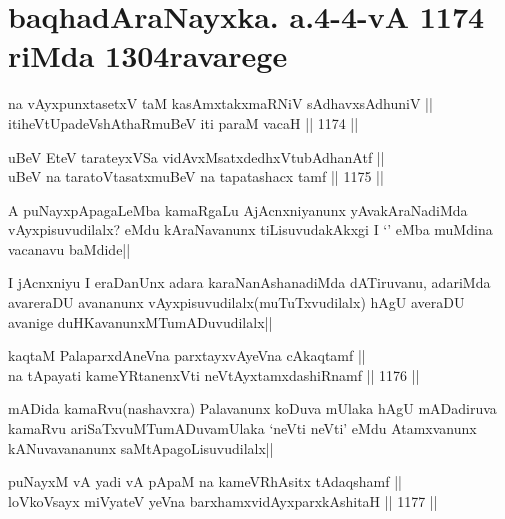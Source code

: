 \section*{baqhadAraNayxka. a.4-4-vA 1174 riMda 1304ravarege}

\begin{shl}
na vAyxpunxtasetxV taM kasAmxtakxmaRNiV sAdhavxsAdhuniV || \\
itiheVtUpadeVshAthaRmuBeV iti paraM vacaH ||  1174 ||  
\end{shl}
				
\begin{shl}
uBeV EteV tarateyxVSa vidAvxMsatxdedhxVtubAdhanAtf || \\
uBeV na taratoV\s tasatxmuBeV na tapatashacx tamf ||  1175 ||  
\end{shl}

\begin{artha}
A puNayxpApagaLeMba kamaRgaLu AjAcnxniyanunx yAvakAraNadiMda vAyxpisuvudilalx? eMdu 
kAraNavanunx tiLisuvudakAkxgi I `\stext' eMba muMdina vacanavu baMdide||
\end{artha}

\begin{artha}
I jAcnxniyu I eraDanUnx adara karaNanAshanadiMda dATiruvanu, adariMda avareraDU avananunx vAyxpisuvudilalx(muTuTxvudilalx) hAgU averaDU avanige duHKavanunxMTumADuvudilalx||
\end{artha}


\begin{shl}
kaqtaM PalaparxdAneVna parxtayxvAyeVna cAkaqtamf ||  \\
na tApayati kameYRtanenxVti neVtAyxtamxdashiRnamf ||  1176 ||  
\end{shl}

\begin{artha}
mADida kamaRvu(nashavxra) Palavanunx koDuva mUlaka hAgU mADadiruva kamaRvu ariSaTxvuMTumADuvamUlaka `neVti neVti' eMdu Atamxvanunx kANuvavananunx saMtApagoLisuvudilalx||
\end{artha}


\begin{shl}
puNayxM vA yadi vA pApaM na kameVRhAsitx tAdaqshamf ||  \\
loVkoV\s sayx miVyateV yeVna barxhamxvidAyxparxkAshitaH ||  1177 ||  
\end{shl}

